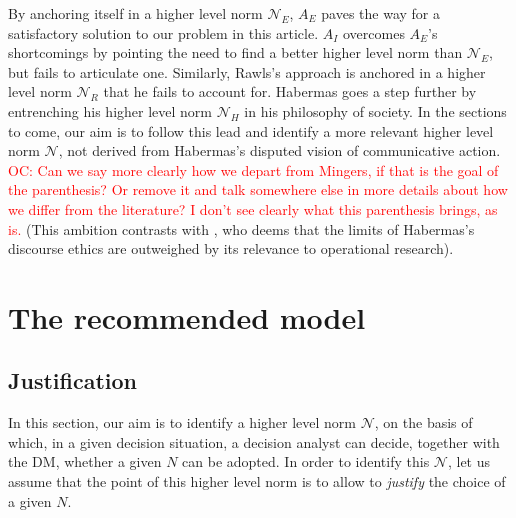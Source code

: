 \documentclass[preprint, french, english, 11pt, authoryear]{elsarticle}%
\newcommand{\commentOC}[1]{\textcolor{red}{OC: #1}}
\newcommand{\adv}{\mathscr{N}}
\begin{document}
By anchoring itself in a higher level norm $\mathscr{N}_E$, $A_E$ paves the way for a satisfactory solution to our problem in this article. $A_I$ overcomes $A_E$'s shortcomings by pointing the need to find a better higher level norm than $\mathscr{N}_E$, but fails to articulate one. Similarly, Rawls's approach is anchored in a higher level norm $\mathscr{N}_{R}$ that he fails to account for. Habermas goes a step further by entrenching his higher level norm $\mathscr{N}_{H}$ in his philosophy of society. In the sections to come, our aim is to follow this lead and identify a more relevant higher level norm $\adv$, not derived from Habermas's disputed vision of communicative action. \commentOC{Can we say more clearly how we depart from Mingers, if that is the goal of the parenthesis? Or remove it and talk somewhere else in more details about how we differ from the literature? I don’t see clearly what this parenthesis brings, as is.} (This ambition contrasts with \citet{mingers_ethics_2011}, who deems that the limits of Habermas's discourse ethics are outweighed by its relevance to operational research).%

\section{The recommended model}
\label{sec:recomm}
\subsection{Justification}
In this section, our aim is to identify a higher level norm $\adv$, on the basis of which, in a given decision situation, a decision analyst can decide, together with the \ac{DM}, whether a given $N$ can be adopted. In order to identify this $\adv$, let us assume that the point of this higher level norm is to allow to \emph{justify} the choice of a given $N$.
\end{document}
